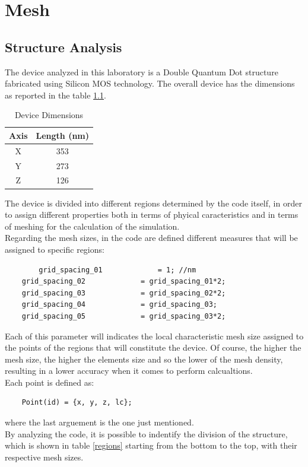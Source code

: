 \chapter{Mesh}
\section{Structure Analysis}
The device analyzed in this laboratory is a Double Quantum Dot structure fabricated using
Silicon MOS technology. The overall device has the dimensions as reported in the table \ref{dimensions}.

\begin{table}[ht]
\centering
\begin{tabular}{|c|c|}
\hline
Axis & Length (nm) \\
\hline
X & 353 \\
Y & 273 \\
Z & 126 \\
\hline
\end{tabular}
\caption{Device Dimensions}
\label{dimensions}
\end{table}

The device is divided into different regions determined by the code itself, in order to 
assign different properties both in terms of phyical caracteristics and in terms of meshing for 
the calculation of the simulation.\\
Regarding the mesh sizes, in the code are defined different measures that will be assigned to specific regions:
\begin{lstlisting}
        grid_spacing_01				= 1; //nm
	grid_spacing_02				= grid_spacing_01*2; 
	grid_spacing_03				= grid_spacing_02*2; 
	grid_spacing_04				= grid_spacing_03; 
	grid_spacing_05				= grid_spacing_03*2; 
\end{lstlisting}
Each of this parameter will indicates the local characteristic mesh size assigned to the points of the regions that will constitute the device. Of course, the higher the mesh size, the higher the elements size and so the lower of the mesh density, resulting in a lower accuracy when it comes to perform calcualtions.\\
Each point is defined as:
\begin{lstlisting}
    Point(id) = {x, y, z, lc};
\end{lstlisting}
where the last arguement is the one just mentioned.\\
By analyzing the code, it is possible to indentify the division of the structure, which is shown in table \ref{regions} starting from the bottom to the top,
with their respective mesh sizes.


